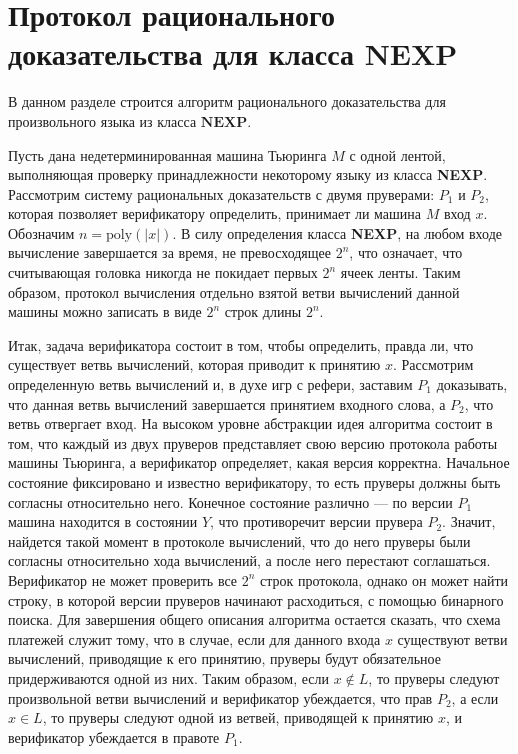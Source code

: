 \documentclass[14pt, a4paper]{extreport}
\begin{document}
        \section{Протокол рационального доказательства для класса $\textbf{NEXP}$}
        В данном разделе строится алгоритм рационального доказательства для произвольного языка из класса $\textbf{NEXP}$.

        Пусть дана недетерминированная машина Тьюринга $M$ с одной лентой, выполняющая проверку принадлежности некоторому языку из класса \textbf{NEXP}. Рассмотрим систему рациональных доказательств с двумя пруверами: $P_1$ и $P_2$, которая позволяет верификатору определить, принимает ли машина $M$ вход $x$. Обозначим $n = \text{poly}(|x|)$. В силу определения класса \textbf{NEXP}, на любом входе вычисление завершается за время, не превосходящее $2 ^ n$, что означает, что считывающая головка никогда не покидает первых $2^n$ ячеек ленты. Таким образом, протокол вычисления отдельно взятой ветви вычислений данной машины можно записать в виде $2^n$ строк длины $2^n$.

        Итак, задача верификатора состоит в том, чтобы определить, правда ли, что существует ветвь вычислений, которая приводит к принятию $x$. Рассмотрим определенную ветвь вычислений и, в духе игр с рефери, заставим $P_1$ доказывать, что данная ветвь вычислений завершается принятием входного слова, а $P_2$, что ветвь отвергает вход. На высоком уровне абстракции идея алгоритма состоит в том, что каждый из двух пруверов представляет свою версию протокола работы машины Тьюринга, а верификатор определяет, какая версия корректна. Начальное состояние фиксировано и известно верификатору, то есть пруверы должны быть согласны относительно него. Конечное состояние различно --- по версии $P_1$ машина находится в состоянии $Y$, что противоречит версии прувера $P_2$. Значит, найдется такой момент в протоколе вычислений, что до него пруверы были согласны относительно хода вычислений, а после него перестают соглашаться.
        Верификатор не может проверить все $2^n$ строк протокола, однако он может найти строку, в которой версии пруверов начинают расходиться, с помощью бинарного поиска. Для завершения общего описания алгоритма остается сказать, что схема платежей служит тому, что в случае, если для данного входа $x$ существуют ветви вычислений, приводящие к его принятию, пруверы будут обязательное придерживаются одной из них. Таким образом, если $x \notin L$, то пруверы следуют произвольной ветви вычислений и верификатор убеждается, что прав $P_2$, а если $x \in L$, то пруверы следуют одной из ветвей, приводящей к принятию $x$, и верификатор убеждается в правоте $P_1$.
\end{document}
